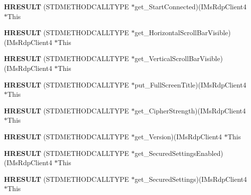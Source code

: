 \begin{DoxyCompactItemize}
{\bfseries H\+R\+E\+S\+U\+LT} (S\+T\+D\+M\+E\+T\+H\+O\+D\+C\+A\+L\+L\+T\+Y\+PE $\ast$get\+\_\+\+Start\+Connected)(I\+Ms\+Rdp\+Client4 $\ast$This
\item 
\mbox{\label{struct_i_ms_rdp_client4_vtbl_aab6fb4edbc88940ebc515d7a3041dd5c}} 
{\bfseries H\+R\+E\+S\+U\+LT} (S\+T\+D\+M\+E\+T\+H\+O\+D\+C\+A\+L\+L\+T\+Y\+PE $\ast$get\+\_\+\+Horizontal\+Scroll\+Bar\+Visible)(I\+Ms\+Rdp\+Client4 $\ast$This
\item 
\mbox{\label{struct_i_ms_rdp_client4_vtbl_a29a863586700c1188fb907566713a407}} 
{\bfseries H\+R\+E\+S\+U\+LT} (S\+T\+D\+M\+E\+T\+H\+O\+D\+C\+A\+L\+L\+T\+Y\+PE $\ast$get\+\_\+\+Vertical\+Scroll\+Bar\+Visible)(I\+Ms\+Rdp\+Client4 $\ast$This
\item 
\mbox{\label{struct_i_ms_rdp_client4_vtbl_aa6f37d57729668432881d0629b91777f}} 
{\bfseries H\+R\+E\+S\+U\+LT} (S\+T\+D\+M\+E\+T\+H\+O\+D\+C\+A\+L\+L\+T\+Y\+PE $\ast$put\+\_\+\+Full\+Screen\+Title)(I\+Ms\+Rdp\+Client4 $\ast$This
\item 
\mbox{\label{struct_i_ms_rdp_client4_vtbl_a0fd53ef07e12e27e0e0e42dafbd78da7}} 
{\bfseries H\+R\+E\+S\+U\+LT} (S\+T\+D\+M\+E\+T\+H\+O\+D\+C\+A\+L\+L\+T\+Y\+PE $\ast$get\+\_\+\+Cipher\+Strength)(I\+Ms\+Rdp\+Client4 $\ast$This
\item 
\mbox{\label{struct_i_ms_rdp_client4_vtbl_adb70e4c361e382e96deffc4c77e2fbf7}} 
{\bfseries H\+R\+E\+S\+U\+LT} (S\+T\+D\+M\+E\+T\+H\+O\+D\+C\+A\+L\+L\+T\+Y\+PE $\ast$get\+\_\+\+Version)(I\+Ms\+Rdp\+Client4 $\ast$This
\item 
\mbox{\label{struct_i_ms_rdp_client4_vtbl_af5658d4e3391334d0b44960d1074b371}} 
{\bfseries H\+R\+E\+S\+U\+LT} (S\+T\+D\+M\+E\+T\+H\+O\+D\+C\+A\+L\+L\+T\+Y\+PE $\ast$get\+\_\+\+Secured\+Settings\+Enabled)(I\+Ms\+Rdp\+Client4 $\ast$This
\item 
\mbox{\label{struct_i_ms_rdp_client4_vtbl_ac23c580029867b74dc8682eb7f81a68e}} 
{\bfseries H\+R\+E\+S\+U\+LT} (S\+T\+D\+M\+E\+T\+H\+O\+D\+C\+A\+L\+L\+T\+Y\+PE $\ast$get\+\_\+\+Secured\+Settings)(I\+Ms\+Rdp\+Client4 $\ast$This

\end{DoxyCompactItemize}
